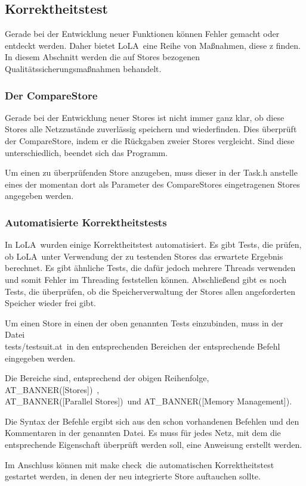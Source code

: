 \documentclass[12pt,a4paper,titlepage]{scrartcl}
\renewcommand \( {\left (}
\renewcommand \) {\right )}
\renewcommand \[ {\left [}
\renewcommand \] {\right ]}
\newcommand \Flqq {\flqq\ }
\newcommand{\lola}{\frqq LoLA\Flqq}
\begin{document}
\subsection{Korrektheitstest}
Gerade bei der Entwicklung neuer Funktionen können Fehler gemacht oder entdeckt werden. Daher bietet \lola eine Reihe von Maßnahmen, diese z finden. In diesem Abschnitt werden die auf Stores bezogenen Qualitätssicherungsmaßnahmen behandelt.

\subsubsection{Der CompareStore}
\label{kap:CompareStore}
Gerade bei der Entwicklung neuer Stores ist nicht immer ganz klar, ob diese Stores alle Netzzustände zuverlässig speichern und wiederfinden. Dies überprüft der CompareStore, indem er die Rückgaben zweier Stores vergleicht. Sind diese unterschiedlich, beendet sich das Programm.

Um einen zu überprüfenden Store anzugeben, muss dieser in der Task.h anstelle eines der momentan dort als Parameter des CompareStores eingetragenen Stores angegeben werden.

\subsubsection{Automatisierte Korrektheitstests}
In \lola wurden einige Korrektheitstest automatisiert. Es gibt Tests, die prüfen, ob \lola unter Verwendung der zu testenden Stores das erwartete Ergebnis berechnet. Es gibt ähnliche Tests, die dafür jedoch mehrere Threads verwenden und somit Fehler im Threading feststellen können. Abschließend gibt es noch Tests, die überprüfen, ob die Speicherverwaltung der Stores allen angeforderten Speicher wieder frei gibt.

Um einen Store in einen der oben genannten Tests einzubinden, muss in der Datei
\\\frqq tests/testsuit.at\Flqq in den entsprechenden Bereichen der entsprechende Befehl eingegeben werden.

Die Bereiche sind, entsprechend der obigen Reihenfolge, \frqq AT\_BANNER([Stores])\Flqq,\\\frqq AT\_BANNER([Parallel Stores])\Flqq und \frqq AT\_BANNER([Memory Management])\flqq.

Die Syntax der Befehle ergibt sich aus den schon vorhandenen Befehlen und den Kommentaren in der genannten Datei. Es muss für jedes Netz, mit dem die entsprechende Eigenschaft überprüft werden soll, eine Anweisung erstellt werden.

Im Anschluss können mit \frqq make check\Flqq die automatischen Korrektheitstest gestartet werden, in denen der neu integrierte Store auftauchen sollte.
\end{document}
